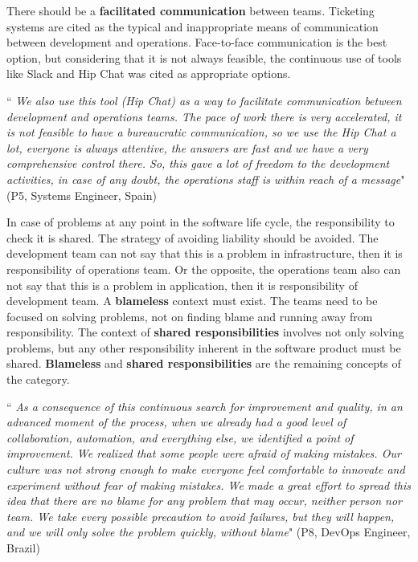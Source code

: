 There should be a \textbf{facilitated communication} between teams. Ticketing
systems are cited as the typical and inappropriate means of communication
between development and operations. Face-to-face communication is the best
option, but considering that it is not always feasible, the continuous use of
tools like Slack and Hip Chat was cited as appropriate options.

\begin{mq}
``\emph{
We also use this tool (Hip Chat) as a way to facilitate communication between
development and operations teams. The pace of work there is very accelerated,
it is not feasible to have a bureaucratic communication, so we use the Hip Chat
a lot, everyone is always attentive, the answers are fast and we have a very
comprehensive control there. So, this gave a lot of freedom to the development
activities, in case of any doubt, the operations staff is within reach of a
message}" (P5, Systems Engineer, Spain)
\end{mq}

In case of problems at any point in the software life cycle, the responsibility
to check it is shared. The strategy of avoiding liability should be avoided.
The development team can not say that this is a problem in infrastructure, then
it is responsibility of operations team. Or the opposite, the operations team
also can not say that this is a problem in application, then it is
responsibility of development team. A \textbf{blameless} context must exist.
The teams need to be focused on solving problems, not on finding blame and
running away from responsibility. The context of \textbf{shared
responsibilities} involves not only solving problems, but any other
responsibility inherent in the software product must be shared.
\textbf{Blameless} and \textbf{shared responsibilities} are the remaining
concepts of the category.

\begin{mq}
``\emph{
As a consequence of this continuous search for improvement and quality, in an
advanced moment of the process, when we already had a good level of
collaboration, automation, and everything else, we identified a point of
improvement. We realized that some people were afraid of making mistakes. Our
culture was not strong enough to make everyone feel comfortable to innovate and
experiment without fear of making mistakes. We made a great effort to spread
this idea that there are no blame for any problem that may occur, neither
person nor team. We take every possible precaution to avoid failures, but they
will happen, and we will only solve the problem quickly, without blame}" (P8,
DevOps Engineer, Brazil)
\end{mq}


